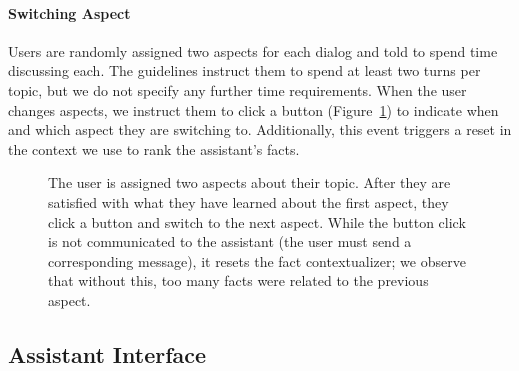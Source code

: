 \paragraph{Switching Aspect}
Users are randomly assigned two aspects for each dialog and told to spend time discussing each.
The guidelines instruct them to spend at least two turns per topic, but we do not specify any further time requirements.
When the user changes aspects, we instruct them to click a button (Figure~\ref{fig:switch-aspect}) to indicate when and which aspect they are switching to.
Additionally, this event triggers a reset in the context we use to rank the assistant's facts.

\begin{figure}[ht]
    \centering
    \caption{
        The user is assigned two aspects about their topic.
        After they are satisfied with what they have learned about the first aspect, they click a button and switch to the next aspect.
        While the button click is not communicated to the assistant (the user must send a corresponding message), it resets the fact contextualizer; we observe that without this, too many facts were related to the previous aspect.
    }
    \label{fig:switch-aspect}
\end{figure}

\subsection{Assistant Interface}


